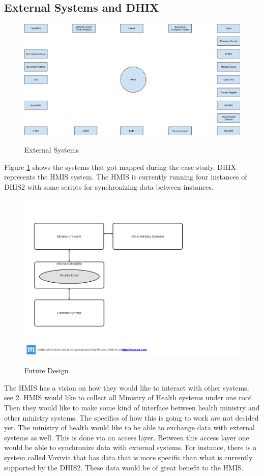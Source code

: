 \subsection{External Systems and DHIX}
\begin{figure}
\centering
\includegraphics[width=12cm]{empirical/images/context}
\label{external_systems}
\caption{External Systems}
\end{figure}
Figure \ref{external_systems} shows the systems that got mapped during the case study. DHIX represents the HMIS system. The HMIS is currently running four instances of DHIS2 with some scripts for synchronizing data between instances.
\begin{figure}
\centering
\includegraphics[width=12cm]{empirical/images/future_design_rwanda}
\label{future_design}
\caption{Future Design}
\end{figure}
The HMIS has a vision on how they would like to interact with other systems, see \ref{future_design}. HMIS would like to collect all Ministry of Health systems under one roof. Then they would like to make some kind of interface between health ministry and other ministry systems. The specifics of how this is going to work are not decided yet. The ministry of health would like to be able to exchange data with external systems as well. This is done via an access layer. Between this access layer one would be able to synchronize data with external systems. For instance, there is a system called Voxivia that has data that is more specific than what is currently supported by the DHIS2. These data would be of great benefit to the HMIS. 
